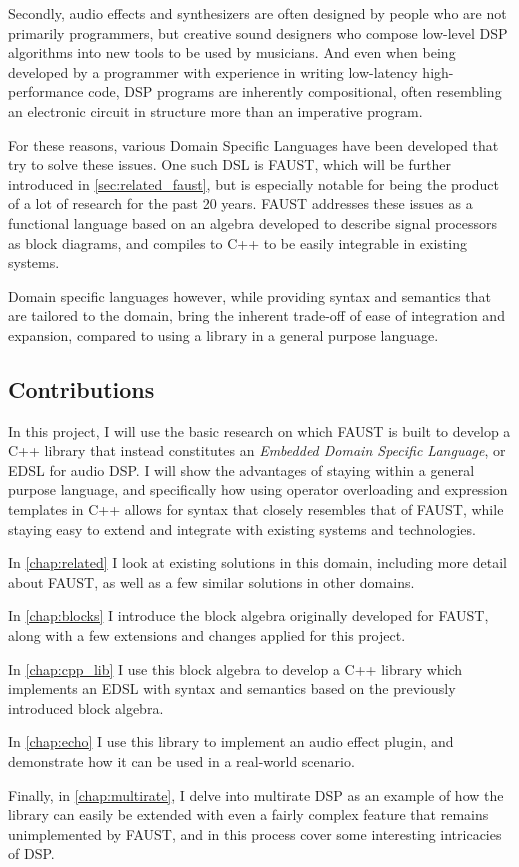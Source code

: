 Secondly, audio effects and synthesizers are often designed by people who are not primarily programmers, but
creative sound designers who compose low-level DSP algorithms into new tools to be used by musicians. And
even when being developed by a programmer with experience in writing low-latency high-performance code, DSP
programs are inherently compositional, often resembling an electronic circuit in structure more than an
imperative program.

For these reasons, various Domain Specific Languages have been developed that try to solve these issues. One
such DSL is FAUST\autocite{faustwebsite}, which will be further introduced in \autoref{sec:related_faust}, but is
especially notable for being the product of a lot of research for the past 20 years. FAUST addresses these
issues as a functional language based on an algebra developed to describe signal processors as block
diagrams, and compiles to C++ to be easily integrable in existing systems.

Domain specific languages however, while providing syntax and semantics that are tailored to the domain,
bring the inherent trade-off of ease of integration and expansion, compared to using a library in a general
purpose language.

\subsection{Contributions}

In this project, I will use the basic research on which FAUST is built to develop a C++ library that instead
constitutes an \emph{Embedded Domain Specific Language}, or EDSL for audio DSP. I will show the advantages of staying within a
general purpose language, and specifically how using operator overloading and expression templates in C++
allows for syntax that closely resembles that of FAUST, while staying easy to extend and integrate with
existing systems and technologies.

In \autoref{chap:related} I look at existing solutions in this domain, including more detail about FAUST, as
well as a few similar solutions in other domains.

In \autoref{chap:blocks} I introduce the block algebra originally developed for FAUST, along with a few
extensions and changes applied for this project.

In \autoref{chap:cpp_lib} I use this block algebra to develop a C++ library which implements an EDSL with
syntax and semantics based on the previously introduced block algebra.

In \autoref{chap:echo} I use this library to implement an audio effect plugin, and demonstrate how it can
be used in a real-world scenario.

Finally, in \autoref{chap:multirate}, I delve into multirate DSP as an example of how the library can easily be
extended with even a fairly complex feature that remains unimplemented by FAUST, and in this process cover
some interesting intricacies of DSP.
